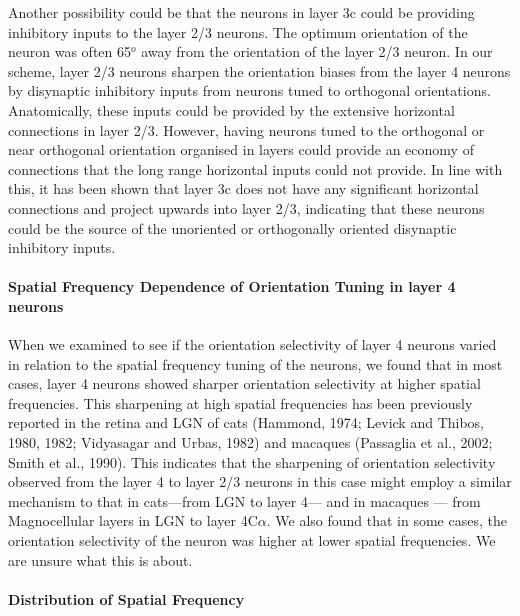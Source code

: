Another possibility could be that the neurons in layer 3c could be providing inhibitory inputs to the layer 2/3 neurons. The optimum orientation of the neuron was often 65$^o$ away from the orientation of the layer 2/3 neuron. In our scheme, layer 2/3 neurons sharpen the orientation biases from the layer 4 neurons by disynaptic inhibitory inputs from neurons tuned to orthogonal orientations. Anatomically, these inputs could be provided by the extensive horizontal connections in layer 2/3. However, having neurons tuned to the orthogonal or near orthogonal orientation organised in layers could provide an economy of connections that the long range horizontal inputs could not provide. In line with this, it has been shown that layer 3c does not have any significant horizontal connections and project upwards into layer 2/3, indicating that these neurons could be the source of the unoriented or orthogonally oriented disynaptic inhibitory inputs.

\paragraph {Spatial Frequency Dependence of Orientation Tuning in layer 4 neurons}

When we examined to see if the orientation selectivity of layer 4 neurons varied in relation to the spatial frequency tuning of the neurons, we found that in most cases, layer 4 neurons showed sharper orientation selectivity at higher spatial frequencies. This sharpening at high spatial frequencies has been previously reported in the retina and LGN of cats (Hammond, 1974; Levick and Thibos, 1980, 1982; Vidyasagar and Urbas, 1982) and macaques (Passaglia et al., 2002; Smith et al., 1990). This indicates that the sharpening of orientation selectivity observed from the layer 4 to layer 2/3 neurons in this case might employ a similar mechanism to that in cats---from LGN to layer 4--- and in macaques --- from Magnocellular layers in LGN to layer 4C$\alpha$. We also found that in some cases, the orientation selectivity of the neuron was higher at lower spatial frequencies. We are unsure what this is about.


\paragraph{Distribution of Spatial Frequency}


